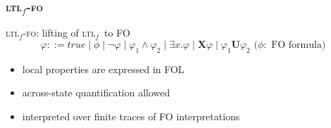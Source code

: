 \documentclass[xcolor=dvipsnames]{beamer}
\newcommand{\nextX}{\mathbf{X}\xspace}
\newcommand{\ltlX}{\nextX}
\newcommand{\ltlU}{\mathbf{U}}
\newcommand{\true}{true}
\newcommand{\ltlf}{\textsc{ltl}$_f$\xspace}
\newcommand{\ltlffo}{\ltlf-\textsc{fo}\xspace}
\begin{document}

\begin{frame}
\frametitle{\ltlffo}

\ltlffo: lifting of \ltlf~to FO
\[
  \varphi ::=  \true \mid \phi  \mid \lnot \varphi \mid \varphi_1 \land \varphi_2 \mid \exists
  x.\varphi \mid \ltlX{\varphi}  \mid \varphi_1 \ltlU \varphi_2\text{ (}\phi:\text{ FO formula)} 
\]



\begin{itemize}	
	\item local properties are expressed in FOL
	\item across-state quantification allowed
	\item interpreted over finite traces of FO interpretations
\end{itemize}

\end{frame}
\end{document}
